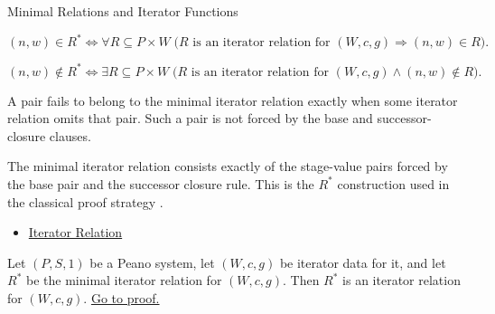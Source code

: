 \begin{topicbox}{Minimal Relations and Iterator Functions}
\begin{remark*}
\[
(n,w)\in R^*
\Longleftrightarrow
\forall R\subseteq P\times W\;
\bigl(R \text{ is an iterator relation for } (W,c,g)
\Longrightarrow (n,w)\in R\bigr).
\]
\end{remark*}


\begin{remark*}
\[
(n,w)\notin R^*
\Longleftrightarrow
\exists R\subseteq P\times W\;
\bigl(R \text{ is an iterator relation for } (W,c,g)\land (n,w)\notin R\bigr).
\]
\end{remark*}

\begin{remark*}
A pair fails to belong to the minimal iterator relation exactly when some
iterator relation omits that pair. Such a pair is not forced by the base and
successor-closure clauses.
\end{remark*}

\begin{remark*}[Interpretation]
The minimal iterator relation consists exactly of the stage-value pairs forced
by the base pair and the successor closure rule. This is the $R^*$ construction
used in the classical proof strategy
\citep{feferman1964numbersystems,hrbacek_jech1999,chi_recursion_wustl}.
\end{remark*}

\begin{remark*}[Dependencies]
\begin{itemize}
  \item \hyperref[def:iterator-relation]{Iterator Relation}
\end{itemize}
\end{remark*}

\begin{tcolorbox}[colback=lembox, colframe=lemborder, arc=2pt,
  left=6pt, right=6pt, top=4pt, bottom=4pt,
  title={\small\textbf{Lemma (Consistency of the Minimal Iterator Relation)}},
  fonttitle=\small\bfseries]
\begin{lemma}
\label{lem:iterator-relation-consistency}
Let $(P,S,1)$ be a Peano system, let $(W,c,g)$ be iterator data for it, and let
$R^*$ be the minimal iterator relation for $(W,c,g)$. Then $R^*$ is an
iterator relation for $(W,c,g)$.
\hyperref[prf:iterator-relation-consistency]{Go to proof.}
\end{lemma}
\end{tcolorbox}


\end{topicbox}
